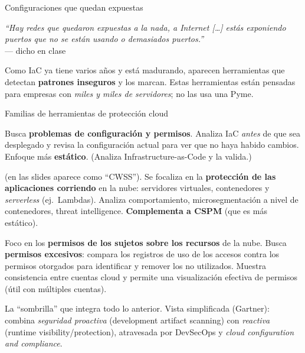 \documentclass[11pt,a4paper]{article}
\newcommand{\prof}[1]{\par\medskip\noindent\textit{``#1''}\\[-2pt]\hspace*{1em}%
  {\footnotesize\textcolor{black!60}{--- dicho en clase}}\par\medskip\noindent}
\begin{document}
\begin{anecbox}{Configuraciones que quedan expuestas}
\prof{Hay redes que quedaron expuestas a la nada, a Internet [\dots] estás exponiendo puertos
que no se están usando o demasiados puertos.} Como IaC ya tiene varios años y está madurando,
aparecen herramientas que detectan \textbf{patrones inseguros} y los marcan. Estas herramientas
están pensadas para empresas con \emph{miles y miles de servidores}; no las usa una Pyme.
\end{anecbox}

\begin{defbox}{Familias de herramientas de protección cloud}
\begin{description}[leftmargin=0pt,labelsep=0.4em,style=nextline,itemsep=3pt]
  \item[CSPM — Cloud Security Posture Management] Busca \textbf{problemas de configuración y
        permisos}. Analiza IaC \emph{antes} de que sea desplegado y revisa la configuración
        actual para ver que no haya habido cambios. Enfoque más \textbf{estático}. (Analiza
        Infrastructure-as-Code y la valida.)
  \item[CWPP — Cloud Workflow/Workload Protection Platform] (en las slides aparece como
        ``CWSS''). Se focaliza en la \textbf{protección de las aplicaciones corriendo} en la
        nube: servidores virtuales, contenedores y \emph{serverless} (ej.\ Lambdas). Analiza
        comportamiento, microsegmentación a nivel de contenedores, threat intelligence.
        \textbf{Complementa a CSPM} (que es más estático).
  \item[CIEM — Cloud Infrastructure Entitlement Management] Foco en los \textbf{permisos de los
        sujetos sobre los recursos} de la nube. Busca \textbf{permisos excesivos}: compara los
        registros de uso de los accesos contra los permisos otorgados para identificar y remover
        los no utilizados. Muestra consistencia entre cuentas cloud y permite una visualización
        efectiva de permisos (útil con múltiples cuentas).
  \item[CNAPP — Cloud Native Application Protection Platform] La ``sombrilla'' que integra todo
        lo anterior. Vista simplificada (Gartner): combina \emph{seguridad proactiva}
        (development artifact scanning) con \emph{reactiva} (runtime visibility/protection),
        atravesada por DevSecOps y \emph{cloud configuration and compliance}.
\end{description}
\end{defbox}
\end{document}
